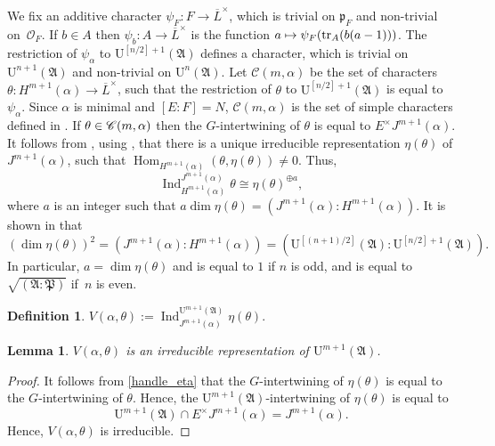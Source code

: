 \documentclass[11pt]{article}
\let\mathcal\mathscr
\newcommand\mto{\mathchoice{\longmapsto}{\mapsto}{\mapsto}{\mapsto}}
\newtheorem{lem}[prop]{Lemma}
\theoremstyle{definition}
\newtheorem{defi}[prop]{Definition}
\DeclareMathOperator{\Hom}{Hom}
\DeclareMathOperator{\Ind}{Ind}
\DeclareMathOperator{\tr}{tr}
\newcommand{\Indu}[3]{\Ind_{#1}^{#2}{#3}}
\newcommand{\Aa}{\mathfrak A}
\newcommand{\Pp}{\mathfrak P}
\newcommand{\cO}{\mathcal{O}}
\newcommand{\pF}{\mathfrak{p}_F}
\newcommand{\UU}{\mathrm U}
\newcommand{\Lbar}{\overline{L}}
\begin{document}
We fix an additive character $\psi_F: F \to \Lbar^{\times}$, which is trivial on $\pF$ and non-trivial on~$\cO_F$. If $b\in A$ then $\psi_b: A\to \Lbar^{\times}$ is the function
$a\mto \psi_F(\tr_A(b(a-1)))$. The restriction of $\psi_{\alpha}$ to $\UU^{[n/2]+1}(\mathfrak A)$ defines a character, which is trivial on $\UU^{n+1}(\Aa)$ and non-trivial on $\UU^n(\Aa)$.
Let $\mathcal C(m, \alpha)$ be the set of characters \hbox{$\theta: H^{m+1}(\alpha)\to \Lbar^{\times}$}, such that the restriction of $\theta$ to $\UU^{[n/2]+1}(\mathfrak A)$ is equal to $\psi_{\alpha}$.
Since $\alpha$ is minimal and \hbox{$[E:F]=N$}, $\mathcal C(m, \alpha)$ is the set of simple characters defined in \cite[(3.2.1)]{BK}. If $\theta\in\nobreak \mathcal C(m, \alpha)$ then the $G$-intertwining of $\theta$ is
equal to $E^{\times} J^{m+1}(\alpha)$. It follows from \hbox{\cite[(8.3.3)]{BF}}, using \hbox{\cite[(3.4.1)]{BK}}, that there is a unique irreducible representation $\eta(\theta)$ of $J^{m+1}(\alpha)$, such that
$\Hom_{H^{m+1}(\alpha)}(\theta, \eta(\theta))\neq 0$. Thus,
\begin{equation}\label{handle_eta}
\Indu{H^{m+1}(\alpha)}{J^{m+1}(\alpha)}{\theta}\cong \eta(\theta)^{\oplus a},
\end{equation}
where $a$ is an integer such that $a \dim \eta(\theta)= (J^{m+1}(\alpha): H^{m+1}(\alpha))$. It is shown in \hbox{\cite[(8.3.3)]{BF}} that
\begin{equation}\label{dim_eta}
(\dim \eta(\theta))^2= (J^{m+1}(\alpha): H^{m+1}(\alpha))=(\UU^{[(n+1)/2]}(\Aa): \UU^{[n/2]+1}(\Aa)).
\end{equation}
In particular, $a=\dim \eta(\theta)$ and is equal to $1$ if $n$ is odd, and is equal to $\sqrt{(\Aa: \Pp)}$ if~$n$ is even.

\begin{defi}
$V(\alpha, \theta):=\Indu{J^{m+1}(\alpha)}{\UU^{m+1}(\Aa)}{\eta(\theta)}$.
\end{defi}

\begin{lem} $V(\alpha, \theta)$ is an irreducible representation of $\UU^{m+1}(\Aa)$.
\end{lem}

\begin{proof} It follows from \eqref{handle_eta} that the $G$-intertwining of $\eta(\theta)$ is equal to the $G$\nobreakdash-inter\-twining of $\theta$. Hence,
the $\UU^{m+1}(\Aa)$-intertwining of $\eta(\theta)$ is equal to
\[
\UU^{m+1}(\Aa)\cap E^{\times} J^{m+1}(\alpha)= J^{m+1}(\alpha).
\]
Hence,
$V(\alpha, \theta)$ is irreducible.
\end{proof}
\end{document}
